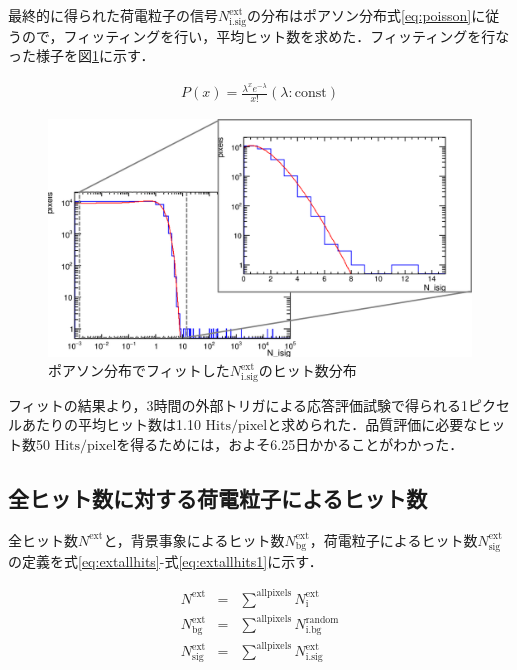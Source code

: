 最終的に得られた荷電粒子の信号$N_{\mathrm{i.sig}}^{\mathrm{ext}}$の分布はポアソン分布式\ref{eq:poisson}に従うので，フィッティングを行い，平均ヒット数を求めた．フィッティングを行なった様子を図\ref{fig:extfit}に示す．

\begin{eqnarray}
  \label{eq:poisson}
  P(x) = \frac{\lambda^x e^{-\lambda}}{x!} (\lambda:\mathrm{const})
\end{eqnarray}

\begin{figure}[h]
  \centering
  \includegraphics[width=15cm]{./figure/extfit.png}
  \caption{ポアソン分布でフィットした$N_{\mathrm{i.sig}}^{\mathrm{ext}}$のヒット数分布}
  \label{fig:extfit}
\end{figure}

フィットの結果より，3時間の外部トリガによる応答評価試験で得られる1ピクセルあたりの平均ヒット数は1.10 $\mathrm{Hits/pixel}$と求められた．品質評価に必要なヒット数50 $\mathrm{Hits/pixel}$を得るためには，およそ6.25日かかることがわかった．

\subsection*{全ヒット数に対する荷電粒子によるヒット数}
全ヒット数$N^{\mathrm{ext}}$と，背景事象によるヒット数$N_{\mathrm{bg}}^{\mathrm{ext}}$，荷電粒子によるヒット数$N_{\mathrm{sig}}^{\mathrm{ext}}$の定義を式\ref{eq:extallhits}-式\ref{eq:extallhits1}に示す．

\begin{eqnarray}
  \label{eq:extallhits}
  N^{\mathrm{ext}} &=& \sum^{\mathrm{allpixels}} N_{\mathrm{i}}^{\mathrm{ext}} \\
  N_{\mathrm{bg}}^{\mathrm{ext}} &=& \sum^{\mathrm{allpixels}} N_{\mathrm{i.bg}}^{\mathrm{random}} \\
  N_{\mathrm{sig}}^{\mathrm{ext}} &=& \sum^{\mathrm{allpixels}} N_{\mathrm{i.sig}}^{\mathrm{ext}}
  \label{eq:extallhits1}
\end{eqnarray}

